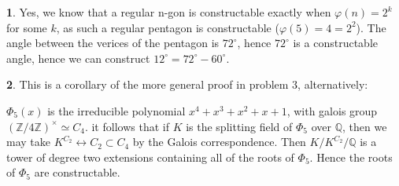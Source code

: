 \documentclass[11pt]{article}
\theoremstyle{definition}
\newtheorem{pb}{}
\begin{document}
    \begin{pb}
        Yes, we know that a regular n-gon is constructable exactly when \(\varphi(n) = 2^k\) for some \(k\), as such a regular pentagon is constructable (\(\varphi(5) = 4 = 2^2\)). The angle between the verices of the pentagon is \(72^\circ\), hence \(72^\circ\) is a constructable angle, hence we can construct \(12^\circ = 72^\circ - 60^\circ\).
    \end{pb}
    \begin{pb}
        This is a corollary of the more general proof in problem 3, alternatively:

        \(\Phi_5(x)\) is the irreducible polynomial \(x^4 + x^3 + x^2 + x + 1\), with galois group \(\left(\mathbb{Z}/4 \mathbb{Z}\right)^\times \simeq C_4\). it follows that if \(K\) is the splitting field of \(\Phi_5\) over \(\mathbb{Q}\), then we may take \(K^{C_2} \longleftrightarrow C_2 \subset C_4\) by the Galois correspondence. Then \(K/K^{C_2}/\mathbb{Q}\) is a tower of degree two extensions containing all of the roots of \(\Phi_5\). Hence the roots of \(\Phi_5\) are constructable.
    \end{pb}
\end{document}
